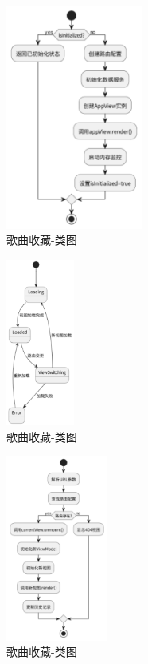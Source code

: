 \documentclass{base}
\begin{document}
\begin{figure}[H]
    \centering
    \includegraphics[width=0.4\textwidth]{images/5-8.png}
    \caption{歌曲收藏-类图}
\end{figure}
\begin{figure}[H]
    \centering
    \includegraphics[width=0.2\textwidth]{images/5-9.png}
    \caption{歌曲收藏-类图}
\end{figure}
\begin{figure}[H]
    \centering
    \includegraphics[width=0.3\textwidth]{images/5-10.png}
    \caption{歌曲收藏-类图}
\end{figure}
\end{document}
